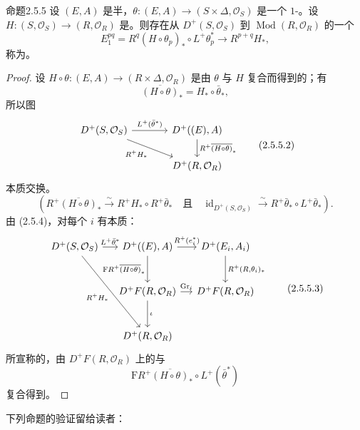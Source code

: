 \begin{SGAresult}{命题}{2.5.5}
设 $(E,A)$ 是半，$\theta:(E,A)\to(S\times\Delta,\mathcal O_S)$ 是一个 $1$-。设 $H:(S,\mathcal O_S)\to(R,\mathcal O_R)$ 是。则存在从 $D^+(S,\mathcal O_S)$ 到 $\operatorname{Mod}(R,\mathcal O_R)$ 的一个
\[
E_1^{pq}=R^q(H\circ\theta_p)_*\circ L^+\theta_p^*
\longrightarrow R^{p+q}H_*,
\]
称为。
\end{SGAresult}
\begin{proof}
设 $H\circ\theta:(E,A)\to(R\times\Delta,\mathcal O_R)$ 是由 $\theta$ 与 $H$ 复合而得到的；有
\[
\overline{(H\circ\theta)}_*=H_*\circ\bar\theta_*, \tag{2.5.5.1}
\]
所以图
\[
\begin{tikzcd}[column sep=large]
D^+(S,\mathcal O_S)\arrow[r,"L^+(\bar\theta^*)"]\arrow[dr,"R^+H_*"']&D^+((E),A)\arrow[d,"R^+\overline{(H\circ\theta)}_*"]\\
&D^+(R,\mathcal O_R)
\end{tikzcd}\tag{2.5.5.2}
\]
本质交换。
\[
\left(R^+\overline{(H\circ\theta)}_*\xrightarrow{\sim}R^+H_*\circ R^+\bar\theta_*
\quad\text{且}\quad
\operatorname{id}_{D^+(S,\mathcal O_S)}\xrightarrow{\sim}R^+\bar\theta_*\circ L^+\bar\theta_*\right).
\]
由 (2.5.4)，对每个 $i$ 有本质：
\[
\begin{tikzcd}[column sep=small,row sep=large]
D^+(S,\mathcal O_S)\arrow[r,"L^+\bar\theta^*"]\arrow[ddr,"R^+H_*"']&D^+((E),A)\arrow[r,"R^+(e_i^*)"]\arrow[d,"\mathrm F R^+\overline{(H\circ\theta)}_*"']&D^+(E_i,A_i)\arrow[d,"{R^+(R,\theta_i)_*}"]\\
&D^+F(R,\mathcal O_R)\arrow[r,"\operatorname{Gr}_i"]\arrow[d,"\iota"]&D^+F(R,\mathcal O_R)\\
&D^+(R,\mathcal O_R)&
\end{tikzcd}\tag{2.5.5.3}
\]
所宣称的，由 $D^+F(R,\mathcal O_R)$ 上的与
\[
\mathrm F R^+\overline{(H\circ\theta)}_*\circ L^+(\bar\theta^*)
\]
复合得到。
\end{proof}
下列命题的验证留给读者：

